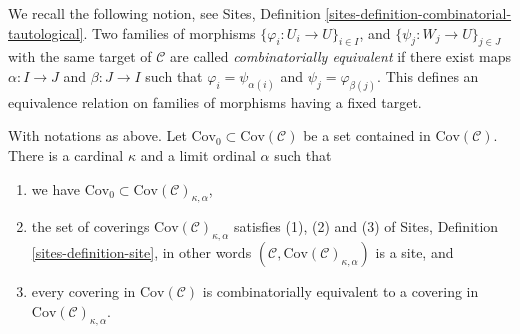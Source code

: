\medskip\noindent
We recall the following notion, see Sites, Definition
\ref{sites-definition-combinatorial-tautological}.
Two families of morphisms $\{\varphi_i : U_i \to U\}_{i\in I}$, and
$\{\psi_j : W_j \to U\}_{j\in J}$ with the same target of $\mathcal{C}$ are
called {\it combinatorially equivalent} if there exist maps
$\alpha : I \to J$ and $\beta : J\to I$ such that
$\varphi_i = \psi_{\alpha(i)}$ and $\psi_j = \varphi_{\beta(j)}$.
This defines an equivalence relation on families of morphisms
having a fixed target.

\begin{lemma}
\label{lemma-coverings-site}
With notations as above.
Let $\text{Cov}_0 \subset \text{Cov}(\mathcal{C})$
be a set contained in $\text{Cov}(\mathcal{C})$.
There is a cardinal $\kappa$ and a limit ordinal $\alpha$ such that
\begin{enumerate}
\item we have $\text{Cov}_0 \subset \text{Cov}(\mathcal{C})_{\kappa, \alpha}$,
\item the set of coverings
$\text{Cov}(\mathcal{C})_{\kappa, \alpha}$ satisfies
(1), (2) and (3) of Sites, Definition \ref{sites-definition-site},
in other words $(\mathcal{C}, \text{Cov}(\mathcal{C})_{\kappa, \alpha})$
is a site, and
\item every covering in $\text{Cov}(\mathcal{C})$
is combinatorially equivalent
to a covering in $\text{Cov}(\mathcal{C})_{\kappa, \alpha}$.
\end{enumerate}
\end{lemma}

